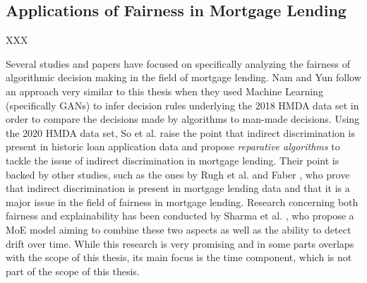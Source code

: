 

\subsection{Applications of Fairness in Mortgage Lending}\label{subsec:mortgage_lending_fairness}

XXX

Several studies and papers have focused on specifically analyzing the fairness of algorithmic decision making in the field of mortgage lending.
Nam and Yun \parencite{Nam2022} follow an approach very similar to this thesis when they used Machine Learning (specifically GANs) to infer decision rules underlying the 2018 HMDA data set in order to compare the decisions made by algorithms to man-made decisions.
Using the 2020 HMDA data set, So et al. \parencite{So2022} raise the point that indirect discrimination is present in historic loan application data and propose \textit{reparative algorithms} to tackle the issue of indirect discrimination in mortgage lending.
Their point is backed by other studies, such as the ones by Rugh et al. \parencite{Rugh2015} and Faber \parencite{Faber2013}, who prove that indirect discrimination is present in mortgage lending data and that it is a major issue in the field of fairness in mortgage lending.
Research concerning both fairness and explainability has been conducted by Sharma et al. \parencite{Sharma2022}, who propose a MoE model aiming to combine these two aspects as well as the ability to detect drift over time.
While this research is very promising and in some parts overlaps with the scope of this thesis, its main focus is the time component, which is not part of the scope of this thesis.

